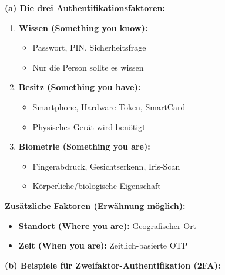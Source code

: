 \documentclass[12pt,a4paper]{article}
\begin{document}
\begin{tcolorbox}[colback=solutionbg, colframe=black!30]

\textbf{(a) Die drei Authentifikationsfaktoren:} \checkmark

\begin{enumerate}[1.]
    \item \textbf{Wissen (Something you know):}
    \begin{itemize}
        \item Passwort, PIN, Sicherheitsfrage
        \item Nur die Person sollte es wissen
    \end{itemize}
    
    \item \textbf{Besitz (Something you have):}
    \begin{itemize}
        \item Smartphone, Hardware-Token, SmartCard
        \item Physisches Gerät wird benötigt
    \end{itemize}
    
    \item \textbf{Biometrie (Something you are):}
    \begin{itemize}
        \item Fingerabdruck, Gesichtserkenn, Iris-Scan
        \item Körperliche/biologische Eigenschaft
    \end{itemize}
\end{enumerate}

\textbf{Zusätzliche Faktoren (Erwähnung möglich):}
\begin{itemize}
    \item \textbf{Standort (Where you are):} Geografischer Ort
    \item \textbf{Zeit (When you are):} Zeitlich-basierte OTP
\end{itemize}

\textbf{(b) Beispiele für Zweifaktor-Authentifikation (2FA):} \checkmark


\end{tcolorbox}
\end{document}
